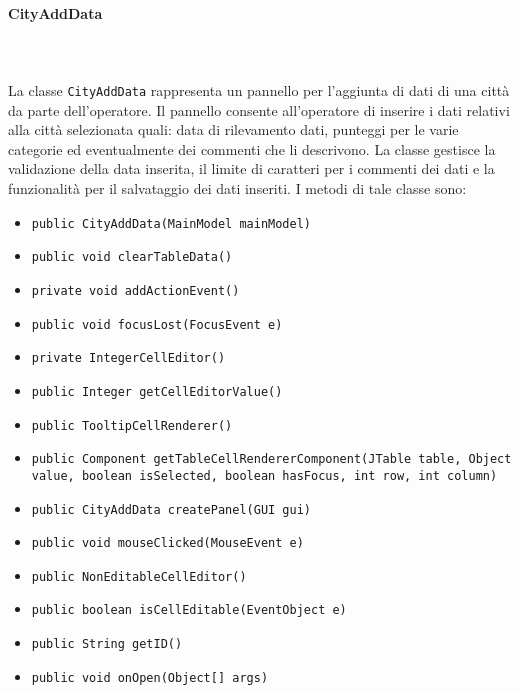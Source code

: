 \paragraph{CityAddData}\\
\\
La classe \texttt{CityAddData} rappresenta un pannello per l'aggiunta di dati di una città da parte dell'operatore.
Il pannello consente all'operatore di inserire i dati relativi alla città selezionata quali: data di rilevamento dati, punteggi per le varie categorie ed eventualmente dei commenti che li descrivono.
La classe gestisce la validazione della data inserita, il limite di caratteri per i commenti dei dati e la funzionalità per il salvataggio dei dati inseriti. 
I metodi di tale classe sono:
\begin{itemize}
    \item \texttt{public CityAddData(MainModel mainModel)}
    \item \texttt{public void clearTableData()}
    \item \texttt{private void addActionEvent()}
    \item \texttt{public void focusLost(FocusEvent e)}
    \item \texttt{private IntegerCellEditor()}
    \item \texttt{public Integer getCellEditorValue()}
    \item \texttt{public TooltipCellRenderer()}
    \item \texttt{public Component getTableCellRendererComponent(JTable table, Object value, boolean isSelected, boolean hasFocus, int row, int column)}
    \item \texttt{public CityAddData createPanel(GUI gui)}
    \item \texttt{public void mouseClicked(MouseEvent e)}
    \item \texttt{public NonEditableCellEditor()}
    \item \texttt{public boolean isCellEditable(EventObject e)}
    \item \texttt{public String getID()}
    \item \texttt{public void onOpen(Object[] args)}
\end{itemize}

